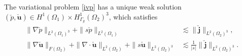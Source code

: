 \documentclass[final,leqno]{siamltex}
\begin{document}
\begin{theorem}\label{wps}
 The variational problem \eqref{ivp} has a unique weak solution $(\breve p,
\breve {\boldsymbol u}) \in H^1 (\Omega_1) \times H^1_{\Gamma_g}(\Omega_2)^3$,
which satisfies
 \begin{align}
\label{sep} \|\nabla \breve {p}\|_{L^2 (\Omega_1)^3} +\|s \breve p\|_{L^2
(\Omega_1)}
&\lesssim \|\breve {\boldsymbol j}\|_{L^2(\Omega_2)^3},\\
\label{seu}  \|\nabla \breve {{\boldsymbol u}}\|_{F(\Omega_2)}
 +\|\nabla \cdot \breve {\boldsymbol u}\|_{L^2(\Omega_2)}+ \| s\breve
{\boldsymbol u}\|_{L^2 (\Omega_2)^3} &\lesssim \frac{1}{ |s|} \|\breve
{\boldsymbol j}\|_{L^2(\Omega_2)^3}.
 \end{align}

\end{theorem}
\end{document}
